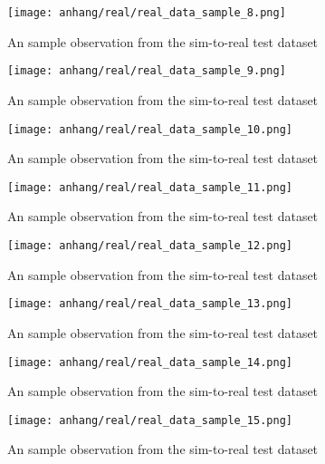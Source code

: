	\begin{figure}[H]
		\centering
		\texttt{[image: anhang/real/real\_data\_sample\_8.png]}
		\caption[An sample observation from the sim-to-real test dataset.]{An sample observation from the sim-to-real test dataset}
	\end{figure}
	\begin{figure}[H]
		\centering
		\texttt{[image: anhang/real/real\_data\_sample\_9.png]}
		\caption[An sample observation from the sim-to-real test dataset.]{An sample observation from the sim-to-real test dataset}
	\end{figure}
	\begin{figure}[H]
		\centering
		\texttt{[image: anhang/real/real\_data\_sample\_10.png]}
		\caption[An sample observation from the sim-to-real test dataset.]{An sample observation from the sim-to-real test dataset}
	\end{figure}
	\begin{figure}[H]
		\centering
		\texttt{[image: anhang/real/real\_data\_sample\_11.png]}
		\caption[An sample observation from the sim-to-real test dataset.]{An sample observation from the sim-to-real test dataset}
	\end{figure}
	\begin{figure}[H]
		\centering
		\texttt{[image: anhang/real/real\_data\_sample\_12.png]}
		\caption[An sample observation from the sim-to-real test dataset.]{An sample observation from the sim-to-real test dataset}
	\end{figure}
	\begin{figure}[H]
		\centering
		\texttt{[image: anhang/real/real\_data\_sample\_13.png]}
		\caption[An sample observation from the sim-to-real test dataset.]{An sample observation from the sim-to-real test dataset}
	\end{figure}
	\begin{figure}[H]
		\centering
		\texttt{[image: anhang/real/real\_data\_sample\_14.png]}
		\caption[An sample observation from the sim-to-real test dataset.]{An sample observation from the sim-to-real test dataset}
	\end{figure}
	\begin{figure}[H]
		\centering
		\texttt{[image: anhang/real/real\_data\_sample\_15.png]}
		\caption[An sample observation from the sim-to-real test dataset.]{An sample observation from the sim-to-real test dataset}
	\end{figure}
	
